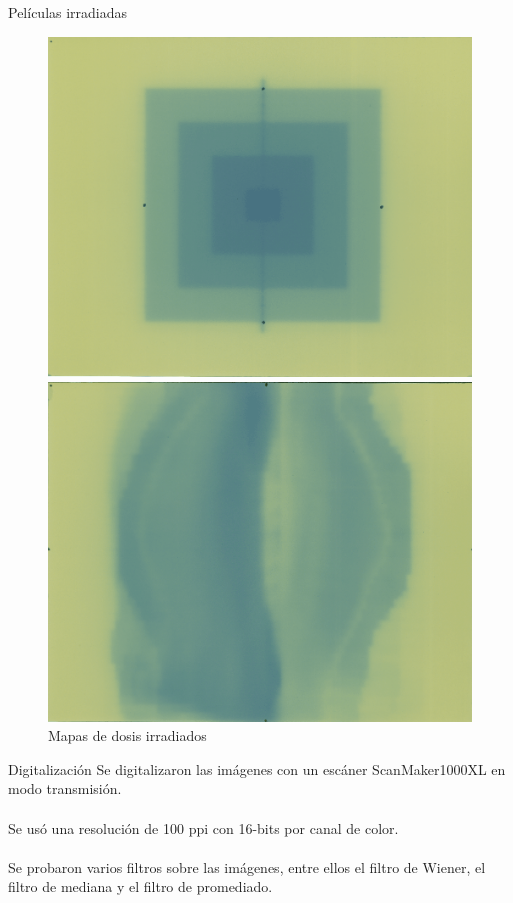 \documentclass[12pt]{beamer}
\begin{document}
\begin{frame}{Películas irradiadas}
\begin{figure}[htp]
\begin{minipage}{0.45\textwidth}
	\includegraphics[width=\textwidth]{images/peliculaPiramide.png}
\end{minipage}\hfill
\begin{minipage}{0.45\textwidth}
	\includegraphics[width=\textwidth]{images/peliculaMama.png}
\end{minipage}
\caption{Mapas de dosis irradiados}
\end{figure}
\end{frame}


\begin{frame}{Digitalización}
Se digitalizaron las imágenes con un escáner  ScanMaker1000XL en modo transmisión.\\~\\

Se usó una resolución de 100 ppi con 16-bits por canal de color.\\~\\

Se probaron varios filtros sobre las imágenes, entre ellos el filtro de Wiener, el filtro de mediana y el filtro de promediado.\\~\\
\end{frame}
\end{document}
